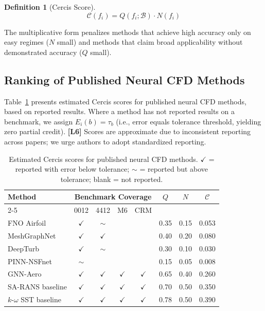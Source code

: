 \documentclass[11pt,a4paper]{article}
\theoremstyle{definition}
\newtheorem{definition}[theorem]{Definition}
\theoremstyle{remark}
\newcommand{\limitationTag}[1]{\textsf{\textbf{[L#1]}}}
\begin{document}
\begin{definition}[Cercis Score]
\begin{equation}
\mathcal{C}(f_i) = Q(f_i; \mathcal{B}) \cdot N(f_i)
\label{eq:cercis}
\end{equation}
\end{definition}

\noindent The multiplicative form penalizes methods that achieve high accuracy only on easy regimes ($N$ small) and methods that claim broad applicability without demonstrated accuracy ($Q$ small).

\subsection{Ranking of Published Neural CFD Methods}

Table~\ref{tab:cercis_ranking} presents estimated Cercis scores for published neural CFD methods, based on reported results. Where a method has not reported results on a benchmark, we assign $E_i(b) = \tau_b$ (i.e., error equals tolerance threshold, yielding zero partial credit).
\limitationTag{6} Scores are approximate due to inconsistent reporting across papers; we urge authors to adopt standardized reporting.

\begin{table}[htbp]
\centering
\caption{Estimated Cercis scores for published neural CFD methods. $\checkmark$ = reported with error below tolerance; $\sim$ = reported but above tolerance; blank = not reported.}
\label{tab:cercis_ranking}
\begin{tabular}{@{}lccccccc@{}}
\toprule
Method & \multicolumn{4}{c}{Benchmark Coverage} & $Q$ & $N$ & $\mathcal{C}$ \\
\cmidrule(lr){2-5}
 & 0012 & 4412 & M6 & CRM &  &  &  \\
\midrule
FNO Airfoil~\citep{li2022learning} & $\checkmark$ & $\sim$ &  &  & 0.35 & 0.15 & 0.053 \\
MeshGraphNet~\citep{pfaff2020learning} & $\checkmark$ & $\checkmark$ &  &  & 0.40 & 0.20 & 0.080 \\
DeepTurb~\citep{ling2016reynolds} & $\checkmark$ & $\sim$ &  &  & 0.30 & 0.10 & 0.030 \\
PINN-NSFnet~\citep{jin2021nsfnets} & $\sim$ &  &  &  & 0.15 & 0.05 & 0.008 \\
GNN-Aero~\citep{thuerey2020deep} & $\checkmark$ & $\checkmark$ & $\checkmark$ & $\checkmark$ & 0.65 & 0.40 & 0.260 \\
SA-RANS baseline & $\checkmark$ & $\checkmark$ & $\checkmark$ & $\checkmark$ & 0.70 & 0.50 & 0.350 \\
$k$-$\omega$ SST baseline & $\checkmark$ & $\checkmark$ & $\checkmark$ & $\checkmark$ & 0.78 & 0.50 & 0.390 \\
\bottomrule
\end{tabular}
\end{table}
\end{document}
